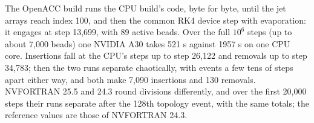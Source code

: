 The OpenACC build runs the CPU build's code, byte for byte, until the jet
arrays reach index 100, and then the common RK4 device step with
evaporation: it engages at step 13,699, with 89 active beads.  Over the full
$10^{6}$ steps (up to about 7,000 beads) one NVIDIA A30 takes 521 s against
1957 s on one CPU core.  Insertions fall at the CPU's steps up to step
26,122 and removals up to step 34,783; then the two runs separate
chaotically, with events a few tens of steps apart either way, and both make
7,090 insertions and 130 removals.  NVFORTRAN 25.5 and 24.3 round divisions
differently, and over the first 20,000 steps their runs separate after the
128th topology event, with the same totals; the reference values are those
of NVFORTRAN 24.3.
